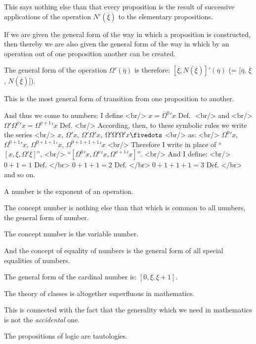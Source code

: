 {This says nothing else than that every proposition
is the result of successive applications
of the operation $N'(\overline{\xi})$ to the elementary propositions.}


{If we are given the general form of the way in
which a proposition is constructed, then thereby
we are also given the general form of the way in
which by an operation out of one proposition
another can be created.}


{The general form of the operation $\Omega'(\overline{\eta})$ is
therefore: $[\overline{\xi}, N(\overline{\xi})]'${}$(\overline{\eta})$ (= [$\overline{\eta}$, $\overline{\xi}$, $N(\overline{\xi})$]).

This is the most general form of transition from
one proposition to another.}


{And thus we come to numbers: I define <br/>
$x = \Omega^{0}{}' x \text{ Def. }$ <br/>
and <br/>
$\Omega'\Omega^{\nu}{}'x = \Omega^{\nu+1}{}'x \text{ Def.}$ <br/>
According, then, to these symbolic rules we
write the series <br/>
$x$, $\Omega'x$, $\Omega'\Omega'x$, $\Omega'\Omega'\Omega'x\fivedots$ <br/>
as: <br/>
$\Omega^{0}{}'x$, $\Omega^{0+1}{}'x$, $\Omega^{0+1+1}{}'x$, $\Omega^{0+1+1+1}{}'x$ \fivedots <br/>
Therefore I write in place of ``$[x, \xi, \Omega'\xi]$'', <br/>
``$[\Omega^{0}{}'x, \Omega^{\nu}{}'x, \Omega^{\nu+1}{}'x]\text{''.}$ <br/>
And I define: <br/>
$0 + 1 = 1\text{ Def.}$ </br>
$0 + 1 + 1 = 2\text{ Def.}$ </br>
$0 + 1 + 1 + 1 = 3\text{ Def.}$ </br>
and so on.}

{A number is the exponent of an operation.}


{The concept number is nothing else than that
which is common to all numbers, the general form
of number.

The concept number is the variable number.

And the concept of equality of numbers is the
general form of all special equalities of numbers.}


{The general form of the cardinal number is:
$[0, \xi, \xi + 1]$.}


{The theory of classes is altogether superfluous
in mathematics.

This is connected with the fact that the generality
which we need in mathematics is not the
\emph{accidental} one.}


{The propositions of logic are tautologies.}


